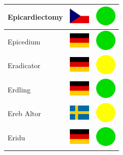 \documentclass[12pt, a4paper, twoside]{report}
\begin{document}
\begin{center}
\begin{longtable}{|p{5cm}|p{2cm}|p{2cm}|}
 Epicardiectomy                                             & \includegraphics[width=1cm]{../4x3/cz} &   \includegraphics[width=1cm]{../likes/y} \\ \hline
 Epicedium                                                  & \includegraphics[width=1cm]{../4x3/de} &   \includegraphics[width=1cm]{../likes/y} \\ \hline
 Eradicator                                                 & \includegraphics[width=1cm]{../4x3/de} &   \includegraphics[width=1cm]{../likes/m} \\ \hline
 Erdling                                                    & \includegraphics[width=1cm]{../4x3/de} &   \includegraphics[width=1cm]{../likes/y} \\ \hline
 Ereb Altor                                                 & \includegraphics[width=1cm]{../4x3/se} &   \includegraphics[width=1cm]{../likes/m} \\ \hline
 Eridu                                                      & \includegraphics[width=1cm]{../4x3/de} &   \includegraphics[width=1cm]{../likes/y} \\ \hline

\end{longtable}
\end{center}
\end{document}
